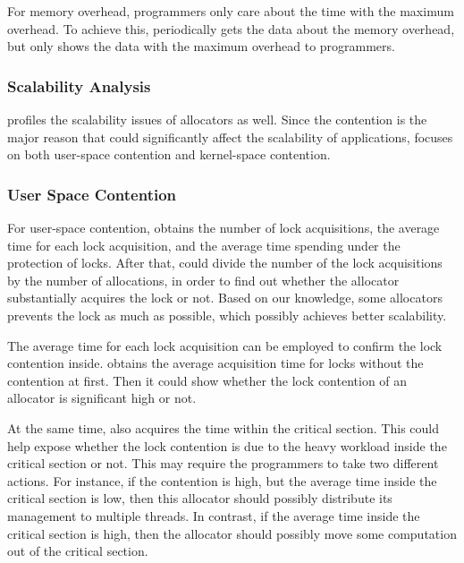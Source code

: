 For memory overhead, programmers only care about the time with the maximum overhead. To achieve this, \MP{} periodically gets the data about the memory overhead, but only shows the data with the maximum overhead to programmers.  
 

\subsubsection{Scalability Analysis} 

\MP{} profiles the scalability issues of allocators as well. Since the contention is the major reason that could significantly affect the scalability of applications, \MP{} focuses on both user-space contention and kernel-space contention. 

\subsubsection{User Space Contention}
For user-space contention, \MP{} obtains the number of lock acquisitions, the average time for each lock acquisition, and the average time spending under the protection of locks. After that, \MP{} could divide the number of the lock acquisitions by the number of allocations, in order to find out whether the allocator substantially acquires the lock or not. Based on our knowledge, some allocators prevents the lock as much as possible, which possibly achieves better scalability. 

The average time for each lock acquisition can be employed to confirm the lock contention inside. \MP{} obtains the average acquisition time for locks without the contention at first. Then it could show whether the lock contention of an allocator is significant high or not.

At the same time, \MP{} also acquires the time within the critical section. This could help expose whether the lock contention is due to the heavy workload inside the critical section or not. This may require the programmers to take two different actions. For instance, if the contention is high, but the average time inside the critical section is low, then this allocator should possibly distribute its management to multiple threads. In contrast, if the average time inside the critical section is high, then the allocator should possibly move some computation out of the critical section. 

